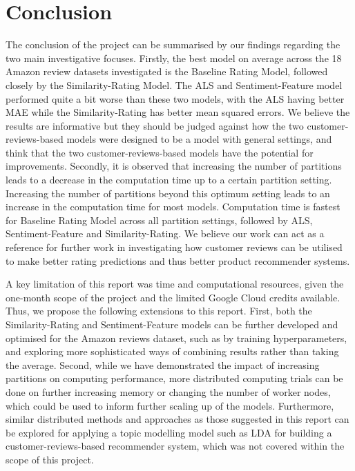 \documentclass[sigconf,authorversion,nonacm]{acmart}
\begin{document}
\section{Conclusion}

The conclusion of the project can be summarised by our findings regarding the two main investigative focuses. Firstly, the best model on average across the 18 Amazon review datasets investigated is the Baseline Rating Model, followed closely by the Similarity-Rating Model. The ALS and Sentiment-Feature model performed quite a bit worse than these two models, with the ALS having better MAE while the Similarity-Rating has better mean squared errors. We believe the results are informative but they should be judged against how the two customer-reviews-based models were designed to be a model with general settings, and think that the two customer-reviews-based models have the potential for improvements. Secondly, it is observed that increasing the number of partitions leads to a decrease in the computation time up to a certain partition setting. Increasing the number of partitions beyond this optimum setting leads to an increase in the computation time for most models. Computation time is fastest for Baseline Rating Model across all partition settings, followed by ALS, Sentiment-Feature and Similarity-Rating. We believe our work can act as a reference for further work in investigating how customer reviews can be utilised to make better rating predictions and thus better product recommender systems. 
 
A key limitation of this report was time and computational resources, given the one-month scope of the project and the limited Google Cloud credits available. Thus, we propose the following extensions to this report. First, both the Similarity-Rating and Sentiment-Feature models can be further developed and optimised for the Amazon reviews dataset, such as by training hyperparameters, and exploring more sophisticated ways of combining results rather than taking the average. Second, while we have demonstrated the impact of increasing partitions on computing performance, more distributed computing trials can be done on further increasing memory or changing the number of worker nodes, which could be used to inform further scaling up of the models. Furthermore, similar distributed methods and approaches as those suggested in this report can be explored for applying a topic modelling model such as LDA for building a customer-reviews-based recommender system, which was not covered within the scope of this project. 
\end{document}
